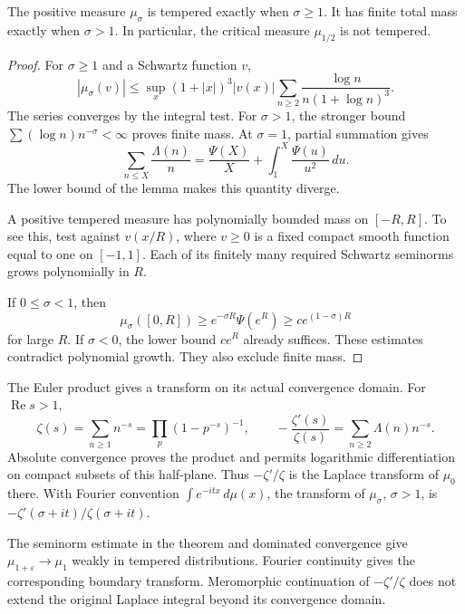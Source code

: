 \begin{theorem}
\label{v4-arith:weil:thm:prime-threshold}
The positive measure \(\mu_\sigma\) is tempered exactly when
\(\sigma\ge1\). It has finite total mass exactly when \(\sigma>1\).
In particular, the critical measure \(\mu_{1/2}\) is not tempered.
\end{theorem}
\begin{proof}
For \(\sigma\ge1\) and a Schwartz function \(v\),
\[
 |\mu_\sigma(v)|
 \le\sup_x(1+|x|)^3|v(x)|
       \sum_{n\ge2}\frac{\log n}{n(1+\log n)^3}.
\]
The series converges by the integral test. For \(\sigma>1\), the
stronger bound \(\sum(\log n)n^{-\sigma}<\infty\) proves finite mass.
At \(\sigma=1\), partial summation gives
\[
 \sum_{n\le X}\frac{\Lambda(n)}n
 =\frac{\Psi(X)}X+\int_1^X\frac{\Psi(u)}{u^2}\,du.
\]
The lower bound of the lemma makes this quantity diverge.

A positive tempered measure has polynomially bounded mass on
\([-R,R]\). To see this, test against \(v(x/R)\), where \(v\ge0\) is a
fixed compact smooth function equal to one on \([-1,1]\).
Each of its finitely many required Schwartz seminorms grows polynomially
in \(R\).

If \(0\le\sigma<1\), then
\[
 \mu_\sigma([0,R])
 \ge e^{-\sigma R}\Psi(e^R)
 \ge c e^{(1-\sigma)R}
\]
for large \(R\). If \(\sigma<0\), the lower bound \(ce^R\) already
suffices. These estimates contradict polynomial growth. They also
exclude finite mass.
\end{proof}

The Euler product gives a transform on its actual convergence domain.
For \(\operatorname{Re}s>1\),
\begin{equation}
 \zeta(s)=\sum_{n\ge1}n^{-s}
         =\prod_p(1-p^{-s})^{-1},\qquad
 -\frac{\zeta'(s)}{\zeta(s)}
       =\sum_{n\ge2}\Lambda(n)n^{-s}.
 \label{v4-arith:weil:eq:euler}
\end{equation}
Absolute convergence proves the product and permits logarithmic
differentiation on compact subsets of this half-plane. Thus
\(-\zeta'/\zeta\) is the Laplace transform of \(\mu_0\) there.
With Fourier convention \(\int e^{-itx}\,d\mu(x)\), the transform of
\(\mu_\sigma\), \(\sigma>1\), is
\(-\zeta'(\sigma+it)/\zeta(\sigma+it)\).

The seminorm estimate in the theorem and dominated convergence give
\(\mu_{1+\varepsilon}\to\mu_1\) weakly in tempered distributions.
Fourier continuity gives the corresponding boundary transform.
Meromorphic continuation of \(-\zeta'/\zeta\) does not extend the original
Laplace integral beyond its convergence domain.

